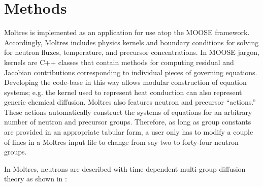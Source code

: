 \documentclass{article}
\let\Oldsection\section
\renewcommand{\section}{\FloatBarrier\Oldsection}
\begin{document}
\section{Methods}

Moltres \cite{lindsay_moltres_2017} is implemented as an application for
use atop the \gls{MOOSE} \cite{gaston_physics-based_2015} framework.
Accordingly, Moltres includes physics kernels and boundary conditions for
solving for neutron fluxes, temperature, and precursor concentrations. In \gls{MOOSE}
jargon, kernels are C++ classes that contain methods for computing residual and
Jacobian contributions corresponding to individual pieces of governing
equations. Developing the code-base in this way allows modular construction
of equation systems; e.g. the kernel used to represent heat
conduction can also represent generic chemical diffusion. Moltres
also features neutron and precursor ``actions.'' These actions automatically
construct the systems of equations for an arbitrary number of neutron and
precursor groups. Therefore, as long as group constants are provided in an appropriate
tabular form, a user only has to modify a couple of lines in a Moltres input
file to change from say two to forty-four neutron groups.

In Moltres, neutrons are described with time-dependent multi-group diffusion theory as shown
in :
\end{document}
